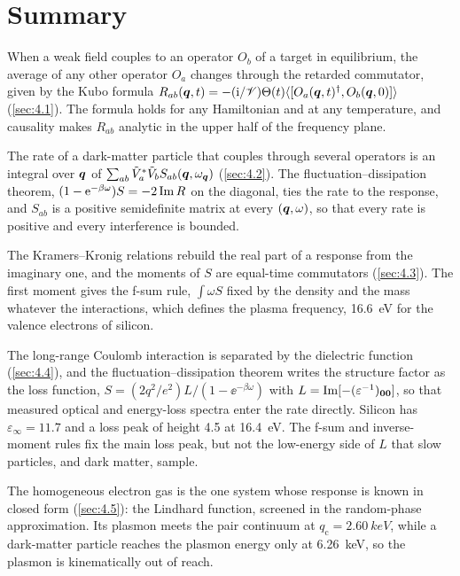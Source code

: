 \section*{Summary}

When a weak field couples to an operator $O_b$ of a target in equilibrium, the average of any other operator $O_a$ changes through the retarded commutator, given by the Kubo formula $R_{ab}(\bm{q},t) = -(\mathrm{i}/\mathscr{V})\Theta(t)\langle[O_a(\bm{q},t)^\dagger, O_b(\bm{q},0)]\rangle$ (\cref{sec:4.1}). The formula holds for any Hamiltonian and at any temperature, and causality makes $R_{ab}$ analytic in the upper half of the frequency plane.

The rate of a dark-matter particle that couples through several operators is an integral over $\bm{q}$ of $\sum_{ab}\tilde V_a^*\tilde V_bS_{ab}(\bm{q},\omega_{\bm{q}})$ (\cref{sec:4.2}). The fluctuation--dissipation theorem, $(1 - \mathrm{e}^{-\beta\omega})S = -2\operatorname{Im} R$ on the diagonal, ties the rate to the response, and $S_{ab}$ is a positive semidefinite matrix at every $(\bm{q},\omega)$, so that every rate is positive and every interference is bounded.

The Kramers--Kronig relations rebuild the real part of a response from the imaginary one, and the moments of $S$ are equal-time commutators (\cref{sec:4.3}). The first moment gives the f-sum rule, $\int\omega S$ fixed by the density and the mass whatever the interactions, which defines the plasma frequency, \SI{16.6}{eV} for the valence electrons of silicon.

The long-range Coulomb interaction is separated by the dielectric function (\cref{sec:4.4}), and the fluctuation--dissipation theorem writes the structure factor as the loss function, $S = (2q^2/e^2)L/(1 - \ee^{-\beta\omega})$ with $L = \operatorname{Im}[-(\varepsilon^{-1})_{\bm{0}\bm{0}}]$, so that measured optical and energy-loss spectra enter the rate directly. Silicon has $\varepsilon_\infty = 11.7$ and a loss peak of height 4.5 at \SI{16.4}{eV}. The f-sum and inverse-moment rules fix the main loss peak, but not the low-energy side of $L$ that slow particles, and dark matter, sample.

The homogeneous electron gas is the one system whose response is known in closed form (\cref{sec:4.5}): the Lindhard function, screened in the random-phase approximation. Its plasmon meets the pair continuum at $q_{\mathrm{c}} = \SI{2.60}{keV}$, while a dark-matter particle reaches the plasmon energy only at \SI{6.26}{keV}, so the plasmon is kinematically out of reach.

